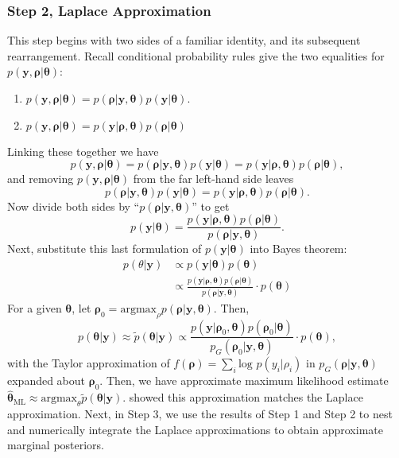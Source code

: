 \subsubsection{Step 2, Laplace Approximation}  %

This step begins with two sides of a familiar identity, and its subsequent rearrangement. Recall conditional probability rules give the two equalities for $p(\pmb{y} , \pmb{\rho} | \pmb{\theta})$:
\begin{enumerate}
\item $p(\pmb{y} , \pmb{\rho} | \pmb{\theta}) = p(\pmb{\rho} | \pmb{y}, \pmb{\theta}) p(\pmb{y} | \pmb{\theta})$. 
\item $p(\pmb{y} , \pmb{\rho} | \pmb{\theta}) = p(\pmb{y} | \pmb{\rho}, \pmb{\theta}) p(\pmb{\rho} | \pmb{\theta})$
\end{enumerate} 
Linking these together we have
$$ p(\pmb{y} , \pmb{\rho} | \pmb{\theta}) = p(\pmb{\rho} | \pmb{y}, \pmb{\theta}) p(\pmb{y} | \pmb{\theta}) = p(\pmb{y} | \pmb{\rho}, \pmb{\theta}) p(\pmb{\rho} | \pmb{\theta}),$$
and removing $p(\pmb{y} , \pmb{\rho} | \pmb{\theta})$ from the far left-hand side leaves
$$ p(\pmb{\rho} | \pmb{y}, \pmb{\theta}) p(\pmb{y} | \pmb{\theta}) = p(\pmb{y} | \pmb{\rho}, \pmb{\theta}) p(\pmb{\rho} | \pmb{\theta}). $$
Now divide both sides by ``$p(\pmb{\rho} | \pmb{y}, \pmb{\theta})$'' to get 
\begin{equation}
p(\pmb{y} | \pmb{\theta}) = \frac{p(\pmb{y} | \pmb{\rho}, \pmb{\theta}) p(\pmb{\rho} | \pmb{\theta})} {p(\pmb{\rho} | \pmb{y}, \pmb{\theta})}.
\end{equation}
Next, substitute this last formulation of $p(\pmb{y}|\pmb{\theta})$ into Bayes theorem:
\begin{align}
p(\theta|\pmb{y}) & \propto p(\pmb{y}|\pmb{\theta})p(\pmb{\theta}) \nonumber \\
& \propto \frac{p(\pmb{y} | \pmb{\rho}, \pmb{\theta}) p(\pmb{\rho} | \pmb{\theta})}{p(\pmb{\rho} | \pmb{y}, \pmb{\theta})} \cdot p(\pmb{\theta})
\end{align}
For a given $\pmb{\theta}$, let $\pmb{\rho}_{0} = \text{argmax}_{\rho}p(\pmb{\rho}|\pmb{y},\pmb{\theta})$. Then,
\begin{equation} \label{eq:la}
p(\pmb{\theta}|\pmb{y}) \approx \tilde{p}(\pmb{\theta}|\pmb{y}) \propto  \frac{p(\pmb{y} | \pmb{\rho}_{0}, \pmb{\theta}) p(\pmb{\rho}_{0} | \pmb{\theta})}{p_{G}(\pmb{\rho}_{0} | \pmb{y}, \pmb{\theta})} \cdot p(\pmb{\theta}),
\end{equation}
with the Taylor approximation of $f(\pmb{\rho}) = \sum_{i} \text{log }p(y_{i}|\rho_{i})$ in $p_{G}(\pmb{\rho} | \pmb{y}, \pmb{\theta})$ expanded about $\pmb{\rho}_{0}$. Then, we have approximate maximum likelihood estimate $\hat{\pmb{\theta}}_{\text{ML}} \approx \text{argmax}_{\theta} \tilde{p}(\pmb{\theta}|\pmb{y})$. \cite{Tierney1986} showed this approximation matches the Laplace approximation. 
Next, in Step 3, we use the results of Step 1 and Step 2 to nest and numerically integrate the Laplace approximations to obtain approximate marginal posteriors.

